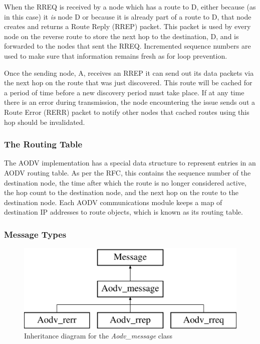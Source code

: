 When the RREQ is received by a node which has a route to D, either because (as in this case) it \textit{is} node D or because it is already part of a route to D, that node creates and returns a Route Reply (RREP) packet. This packet is used by every node on the reverse route to store the next hop to the destination, D, and is forwarded to the nodes that sent the RREQ. Incremented sequence numbers are used to make sure that information remains fresh as for loop prevention. 

Once the sending node, A, receives an RREP it can send out its data packets via the next hop on the route that was just discovered. This route will be cached for a period of time before a new discovery period must take place. If at any time there is an error during transmission, the node encountering the issue sends out a Route Error (RERR) packet to notify other nodes that cached routes using this hop should be invalidated.

\subsubsection{The Routing Table}
The AODV implementation has a special data structure to represent entries in an AODV routing table. As per the RFC, this contains the sequence number of the destination node, the time after which the route is no longer considered active, the hop count to the destination node, and the next hop on the route to the destination node. Each AODV communications module keeps a map of destination IP addresses to route objects, which is known as its routing table.

\subsubsection{Message Types}
\begin{figure}
\centering	
\includegraphics[scale=0.4]{../documentation/latex/class_aodv__message}	
\caption{Inheritance diagram for the \textit{Aodv\_message} class}
\label{aodvmess}
\end{figure}

